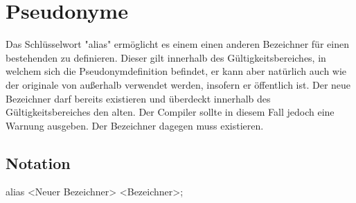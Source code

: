 \chapter{Pseudonyme}

Das Schlüsselwort "alias" ermöglicht es einem einen anderen Bezeichner für einen bestehenden zu definieren. Dieser gilt innerhalb
des Gültigkeitsbereiches, in welchem sich die Pseudonymdefinition befindet, er kann aber natürlich auch wie der originale von außerhalb
verwendet werden, insofern er öffentlich ist.
Der neue Bezeichner darf bereits existieren und überdeckt innerhalb des Gültigkeitsbereiches den alten. Der Compiler sollte in
diesem Fall jedoch eine Warnung ausgeben.
Der Bezeichner dagegen muss existieren.

\section{Notation}
alias <Neuer Bezeichner> <Bezeichner>;